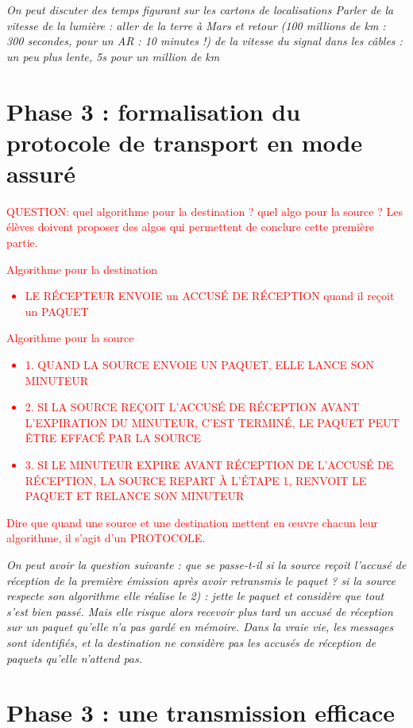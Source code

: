 \documentclass[10pt,a4paper]{article}
\begin{document}
\textit{On peut discuter des temps figurant sur les cartons de localisations
  Parler de la vitesse de la lumière : aller de la terre à Mars et retour (100
  millions de km : 300 secondes, pour un AR : 10 minutes !) de la vitesse du
  signal dans les câbles : un peu plus lente, 5s pour un million de km}


\section{Phase 3 : formalisation du protocole de transport en mode assuré}

\textcolor{red}{QUESTION: quel algorithme pour la destination ? quel algo pour
  la source ? Les élèves doivent proposer des algos qui permettent de conclure
cette première partie.}

\textcolor{red}{Algorithme pour la destination 
  \begin{itemize}
    \item LE RÉCEPTEUR ENVOIE un ACCUSÉ DE RÉCEPTION quand il reçoit un PAQUET
  \end{itemize}
  Algorithme pour la source 
  \begin{itemize}
    \item 1. QUAND LA SOURCE ENVOIE UN PAQUET, ELLE LANCE SON MINUTEUR
    \item 2. SI LA SOURCE REÇOIT L’ACCUSÉ DE RÉCEPTION AVANT L’EXPIRATION DU
      MINUTEUR, C’EST TERMINÉ, LE PAQUET PEUT ÊTRE EFFACÉ PAR LA SOURCE
    \item 3. SI LE MINUTEUR EXPIRE AVANT RÉCEPTION DE L’ACCUSÉ DE RÉCEPTION, LA
      SOURCE REPART À L’ÉTAPE 1, RENVOIT LE PAQUET ET RELANCE SON MINUTEUR
  \end{itemize}
  Dire que quand une source et une destination mettent en œuvre chacun leur
  algorithme, il s’agit d’un PROTOCOLE.
}

\emph{On peut avoir la question suivante : que se passe-t-il si la source
  reçoit l’accusé de réception de la première émission après avoir retransmis
  le paquet ? si la source respecte son algorithme elle réalise le 2) : jette
  le paquet et considère que tout s’est bien passé. Mais elle risque alors
  recevoir plus tard un accusé de réception sur un paquet qu’elle n’a pas gardé
  en mémoire. Dans la vraie vie, les messages sont identifiés, et la
  destination ne considère pas les accusés de réception de paquets qu’elle
n’attend pas.}

\section{Phase 3 : une transmission efficace}
\end{document}
